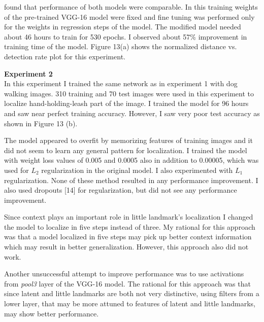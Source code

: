 \documentclass [11pt,letterpaper ,twoside ,openany ]{report}
\begin{document}
    \noindent
    found that performance of both models were comparable. In this training weights of the pre-trained VGG-16 model were fixed and fine tuning was performed only for the weights in regression steps of the model. The modified model needed about 46 hours to train for 530 epochs. I observed about 57\% improvement in training time of the model. Figure 13(a) shows the normalized distance vs. detection rate plot for this experiment.

    \noindent
    \textbf{Experiment 2}\\         
    In this experiment I trained the same network as in experiment 1 with dog walking images. 310 training and 70 test images were used in this experiment to localize hand-holding-leash part of the image. I trained the model for 96 hours and saw near perfect training accuracy. However, I saw very poor test accuracy as shown in Figure 13 (b).

    The model appeared to overfit by memorizing features of training images and it did not seem to learn any general pattern for localization. I trained the model with weight loss values of 0.005 and 0.0005 also in addition to 0.00005, which was used for \(L_2\) regularization in the original model. I also experimented with \(L_1\) regularization. None of these method resulted in any performance improvement. I also used dropouts [14] for regularization, but did not see any performance improvement.

    Since context plays an important role in little landmark's localization I changed the model to localize in five steps instead of three. My rational for this approach was that a model localized in five steps may pick up better context information which may result in better generalization. However, this approach also did not work.

    Another unsuccessful attempt to improve performance was to use activations from \textit{pool3} layer of the VGG-16 model. The rational for this approach was that since latent and little landmarks are both not very distinctive, using filters from a lower layer, that may be more attuned to features of latent and little landmarks, may show better performance. \\
\end{document}
